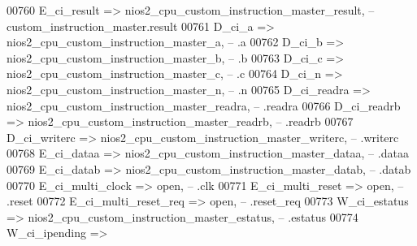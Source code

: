 \begin{DoxyCode}
00760             E\_ci\_result                         => 
      nios2_cpu_custom_instruction_master_result,\textcolor{keyword}{              -- custom\_instruction\_master.result}
00761             D\_ci\_a                              => 
      nios2_cpu_custom_instruction_master_a,\textcolor{keyword}{                   --                          .a}
00762             D\_ci\_b                              => 
      nios2_cpu_custom_instruction_master_b,\textcolor{keyword}{                   --                          .b}
00763             D\_ci\_c                              => 
      nios2_cpu_custom_instruction_master_c,\textcolor{keyword}{                   --                          .c}
00764             D\_ci\_n                              => 
      nios2_cpu_custom_instruction_master_n,\textcolor{keyword}{                   --                          .n}
00765             D\_ci\_readra                         => 
      nios2_cpu_custom_instruction_master_readra,\textcolor{keyword}{              --                          .readra}
00766             D\_ci\_readrb                         => 
      nios2_cpu_custom_instruction_master_readrb,\textcolor{keyword}{              --                          .readrb}
00767             D\_ci\_writerc                        => 
      nios2_cpu_custom_instruction_master_writerc,\textcolor{keyword}{             --                          .writerc}
00768             E\_ci\_dataa                          => 
      nios2_cpu_custom_instruction_master_dataa,\textcolor{keyword}{               --                          .dataa}
00769             E\_ci\_datab                          => 
      nios2_cpu_custom_instruction_master_datab,\textcolor{keyword}{               --                          .datab}
00770             E\_ci\_multi\_clock                    => \textcolor{keywordflow}{open},\textcolor{keyword}{                                                   
       --                          .clk}
00771             E\_ci\_multi\_reset                    => \textcolor{keywordflow}{open},\textcolor{keyword}{                                                   
       --                          .reset}
00772             E\_ci\_multi\_reset\_req                => \textcolor{keywordflow}{open},\textcolor{keyword}{                                                   
       --                          .reset\_req}
00773             W\_ci\_estatus                        => 
      nios2_cpu_custom_instruction_master_estatus,\textcolor{keyword}{             --                          .estatus}
00774             W\_ci\_ipending                       => 

\end{DoxyCode}
